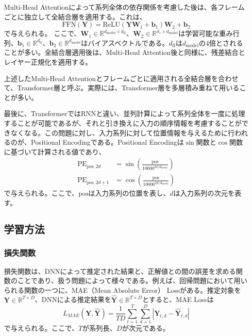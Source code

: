 \documentclass[12pt]{jarticle}
\numberwithin{equation}{section}    %
\numberwithin{figure}{section}      %
\numberwithin{table}{section}      %
\begin{document}
Multi-Head Attentionによって系列全体の依存関係を考慮した後は、各フレームごとに独立して全結合層を適用する。これは、
\begin{equation}
    \text{FFN}(\bm{Y}) = \text{ReLU}(\bm{Y}\bm{W}_{1} + \bm{b}_{1})\bm{W}_{2} + \bm{b}_{2}
\end{equation}
で与えられる。
ここで、$\bm{W}_{1} \in \mathbb{R}^{d_{\text{model}} \times d_{\text{ff}}}$、$\bm{W}_{2} \in \mathbb{R}^{d_{1} \times d_{\text{model}}}$は学習可能な重み行列、$\bm{b}_{1} \in \mathbb{R}^{d_{\text{ff}}}$、$\bm{b}_{2} \in \mathbb{R}^{d_{\text{model}}}$はバイアスベクトルである。$d_{\text{ff}}$は$d_{\text{model}}$の4倍とされることが多い。全結合層適用後は、Multi-Head Attention後と同様に、残差結合とレイヤー正規化を適用する。

上述したMulti-Head Attentionとフレームごとに適用される全結合層を合わせて、Transformer層と呼ぶ。実際には、Transformer層を多層積み重ねて用いることが多い。

最後に、TransformerではRNNと違い、並列計算によって系列全体を一度に処理することが可能であるが、それと引き換えに入力の順序情報を考慮することができなくなる。この問題に対し、入力系列に対して位置情報を与えるために行われるのが、Positional Encodingである。Positional Encodingは$\sin$関数と$\cos$関数に基づいて計算される値であり、
\begin{align}
    \text{PE}_{\text{pos}, 2d}     & = \sin \left(\frac{\text{pos}}{10000^{2d / d_{\text{model}}}}\right) \\
    \text{PE}_{\text{pos}, 2d + 1} & = \cos \left(\frac{\text{pos}}{10000^{2d / d_{\text{model}}}}\right)
\end{align}
で与えられる。ここで、$\text{pos}$は入力系列の位置を表し、$d$は入力系列の次元を表す。

\subsection{学習方法}
\subsubsection{損失関数}
損失関数は、DNNによって推定された結果と、正解値との間の誤差を求める関数のことであり、扱う問題によって様々である。例えば、回帰問題において用いられる関数の一つに、MAE（Mean Absolute Error） Lossがある。推定対象を$\bm{Y} \in \mathbb{R}^{T \times D}$、DNNによる推定結果を$\hat{\bm{Y}} \in \mathbb{R}^{T \times D}$とすると、MAE Lossは
\begin{equation}
    L_{MAE}(\bm{Y}, \hat{\bm{Y}}) = \frac{1}{TD} \sum_{t = 1}^{T} \sum_{d = 1}^{D}  |\bm{Y}_{t, d} - \hat{\bm{Y}}_{t, d}|
\end{equation}
で与えられる。ここで、$T$が系列長、$D$が次元である。
\end{document}
